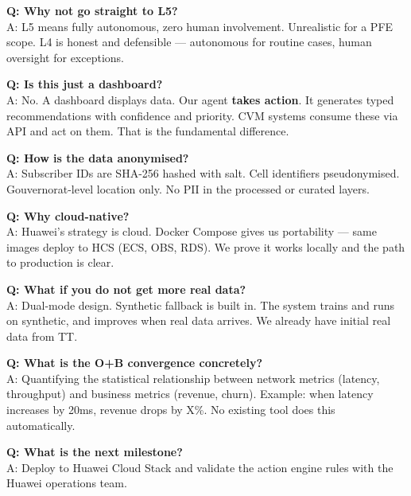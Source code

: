 \documentclass[12pt,a4paper]{article}
\newcommand{\emphasis}[1]{\textbf{\color{huaweired}#1}}
\begin{document}
\textbf{Q: Why not go straight to L5?}\\
A: L5 means fully autonomous, zero human involvement. Unrealistic for a PFE
scope. L4 is honest and defensible --- autonomous for routine cases, human
oversight for exceptions.

\textbf{Q: Is this just a dashboard?}\\
A: No. A dashboard displays data. Our agent \emphasis{takes action}. It
generates typed recommendations with confidence and priority. CVM systems
consume these via API and act on them. That is the fundamental difference.

\textbf{Q: How is the data anonymised?}\\
A: Subscriber IDs are SHA-256 hashed with salt. Cell identifiers pseudonymised.
Gouvernorat-level location only. No PII in the processed or curated layers.

\textbf{Q: Why cloud-native?}\\
A: Huawei's strategy is cloud. Docker Compose gives us portability --- same
images deploy to HCS (ECS, OBS, RDS). We prove it works locally and the path to
production is clear.

\textbf{Q: What if you do not get more real data?}\\
A: Dual-mode design. Synthetic fallback is built in. The system trains and runs
on synthetic, and improves when real data arrives. We already have initial real
data from TT.

\textbf{Q: What is the O+B convergence concretely?}\\
A: Quantifying the statistical relationship between network metrics (latency,
throughput) and business metrics (revenue, churn). Example: when latency
increases by 20ms, revenue drops by X\%. No existing tool does this
automatically.

\textbf{Q: What is the next milestone?}\\
A: Deploy to Huawei Cloud Stack and validate the action engine rules with the
Huawei operations team.
\end{document}
